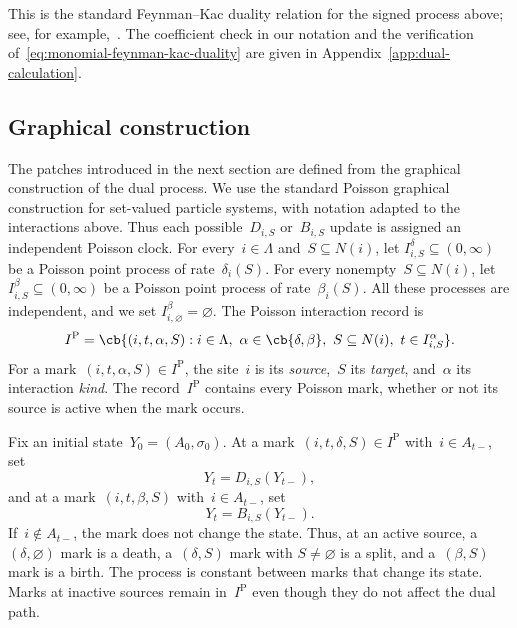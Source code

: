 This is the standard Feynman--Kac duality relation for the signed process above;
see, for example,~\cite{JansenKurt2014}. The coefficient check in our notation
and the verification of~\eqref{eq:monomial-feynman-kac-duality} are given in
Appendix~\ref{app:dual-calculation}.

\subsection{Graphical construction}
\label{subsec:dual-graphical-construction}

The patches introduced in the next section are defined from the graphical
construction of the dual process. We use the standard Poisson graphical construction for set-valued
particle systems, with notation adapted to the interactions above. Thus each
possible~$D_{i,S}$ or~$B_{i,S}$ update is assigned an independent Poisson
clock. For every~$i\in\Lambda$ and~$S\subseteq N(i)$, let
$I_{i,S}^\delta\subseteq(0,\infty)$ be a Poisson point process of
rate~$\delta_i(S)$. For every nonempty~$S\subseteq N(i)$, let
$I_{i,S}^\beta\subseteq(0,\infty)$ be a Poisson point process of
rate~$\beta_i(S)$. All these processes are independent, and we set
$I_{i,\varnothing}^\beta=\varnothing$. The Poisson interaction record is
\begin{equation*}
I^{\mathrm P}
=
\cb{(i,t,\alpha,S):i\in\Lambda,\ \alpha\in\cb{\delta,\beta},\
S\subseteq N(i),\ t\in I_{i,S}^\alpha}.
\end{equation*}
For a mark~$(i,t,\alpha,S)\in I^{\mathrm P}$, the site~$i$ is its
\emph{source},~$S$ its \emph{target}, and~$\alpha$ its interaction \emph{kind}. The
record~$I^{\mathrm P}$ contains every Poisson mark, whether or not its source is
active when the mark occurs.

Fix an initial state~$Y_0=(A_0,\sigma_0)$. At a
mark~$(i,t,\delta,S)\in I^{\mathrm P}$ with~$i\in A_{t-}$, set
\begin{equation*}
Y_t=D_{i,S}(Y_{t-}),
\end{equation*}
and at a mark~$(i,t,\beta,S)$ with~$i\in A_{t-}$, set
\begin{equation*}
Y_t=B_{i,S}(Y_{t-}).
\end{equation*}
If~$i\notin A_{t-}$, the mark does not change the state. Thus, at an active
source, a~$(\delta,\varnothing)$ mark is a death, a~$(\delta,S)$ mark with
$S\neq\varnothing$ is a split, and a~$(\beta,S)$ mark is a birth. The process
is constant between marks that change its state. Marks at inactive sources
remain in~$I^{\mathrm P}$ even though they do not affect the dual path.

